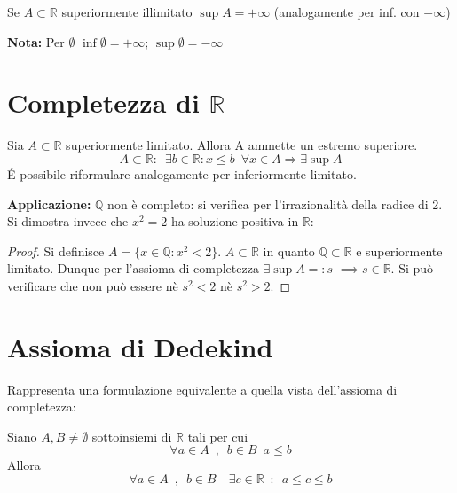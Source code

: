 \documentclass[10pt, oneside]{book}
\theoremstyle{plain}
\begin{document}
\begin{defin}
    Se $A \subset \mathbb{R}$ superiormente illimitato $\sup A = + \infty$ (analogamente per inf. con $- \infty$)
\end{defin}
\textbf{Nota: } Per $\emptyset$ $\inf \emptyset = + \infty$; $\sup \emptyset = - \infty$

\section{Completezza di \texorpdfstring{$\mathbb{R}$}{$\mathbb{R}$}}
\begin{ass}
Sia $A \subset \mathbb{R}$ superiormente limitato. Allora A ammette un estremo superiore.
\[A \subset \mathbb{R} : \enspace \exists b \in \mathbb{R}: x \leq b \enspace \forall x \in A \Longrightarrow \exists \sup A\]
\'E possibile riformulare analogamente per inferiormente limitato.
\end{ass}
\textbf{Applicazione: } $\mathbb{Q}$ non è completo: si verifica per l'irrazionalità della radice di 2. Si dimostra invece che $x^2 = 2$ ha soluzione positiva in $\mathbb{R}$:
\begin{proof}
    Si definisce $A = \{x \in \mathbb{Q} : x^2 < 2\}$. $A \subset \mathbb{R}$ in quanto $\mathbb{Q} \subset \mathbb{R}$ e superiormente limitato. Dunque per l'assioma di completezza $\exists \sup A =: s$ $\implies s \in \mathbb{R}$. Si può verificare che non può essere nè $s^2 < 2$ nè $s^2 > 2$.
\end{proof}

\section{Assioma di Dedekind}
Rappresenta una formulazione equivalente a quella vista dell'assioma di completezza:
\begin{ass}
    Siano $A, B \neq \emptyset$ sottoinsiemi di $\mathbb{R}$ tali per cui 
    \[\forall a \in A \enspace, \enspace b \in B \enspace a \leq b\]
    Allora
    \[\forall a \in A\enspace, \enspace b \in B \quad \exists c \in \mathbb{R} \enspace : \enspace a \leq c \leq b\]
\end{ass}
\end{document}
